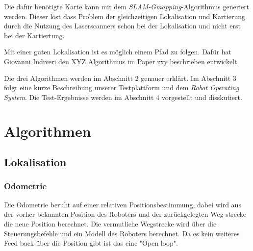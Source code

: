 \documentclass[11pt,a4paper]{article}
\begin{document}
	Die daf\"ur ben\"otigte Karte kann mit dem \textit{SLAM-Gmapping}-Algorithmus generiert werden. Dieser löst dass Problem der gleichzeitigen Lokalisation und Kartierung durch die Nutzung des Laserscanners schon bei der Lokalisation und nicht erst bei der Kartiertung.
	
	Mit einer guten Lokalisation ist es m\"oglich einem Pfad zu folgen. Dafür hat Giovanni Indiveri den XYZ Algorithmus im Paper zxy beschrieben entwickelt. 


	Die drei Algorithmen werden im Abschnitt 2 genauer erkl\"art. Im Abschnitt 3 folgt eine kurze Beschreibung unserer Testplattform und dem \textit{Robot Operating System}. Die Test-Ergebnisse werden im Abschnitt 4 vorgestellt und disskutiert.
  
\newpage

\section{Algorithmen}

\subsection{Lokalisation}
\subsubsection{Odometrie}
{
	Die Odometrie beruht auf einer relativen Positionsbestimmung, dabei wird aus der vorher bekannten Position des Roboters und der zur\"uckgelegten Weg-strecke die neue Position berechnet. Die vermutliche Wegstrecke wird über die Steuerungsbefehle und ein Modell des Roboters berechnet. Da es kein weiteres Feed back über die Position gibt ist das eine "Open loop". 
}
\end{document}
